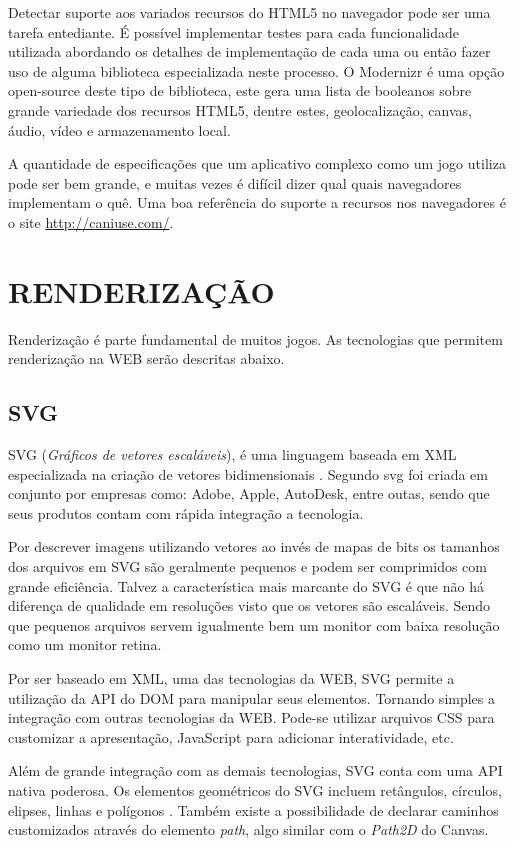 Detectar suporte aos variados recursos do HTML5 no navegador
pode ser uma tarefa entediante. É possível implementar testes para
cada funcionalidade utilizada abordando os detalhes de implementação
de cada uma ou então fazer uso de alguma biblioteca especializada
neste processo. O Modernizr é uma opção open-source deste tipo de
biblioteca, este gera uma lista de booleanos sobre grande variedade dos
recursos HTML5, dentre estes, geolocalização, canvas, áudio, vídeo e
armazenamento local.

A quantidade de especificações que um aplicativo complexo como um jogo
utiliza pode ser bem grande, e muitas vezes é difícil dizer qual quais
navegadores implementam o quê. Uma boa referência do suporte a recursos
nos navegadores é o site \url{http://caniuse.com/}.

\section{RENDERIZAÇÃO}
Renderização é parte fundamental de muitos jogos. As tecnologias que
permitem renderização na WEB serão descritas abaixo.
\subsection{SVG}
SVG (\textit{Gráficos de vetores escaláveis}), é uma linguagem
baseada em XML especializada na criação de vetores bidimensionais
\autocite{html5mostwanted}. Segundo \cite[pp. 4]{svgTime} svg foi criada
em conjunto por empresas como: Adobe, Apple, AutoDesk, entre outas,
sendo que seus produtos contam com rápida integração a tecnologia.

Por descrever imagens utilizando vetores ao invés de mapas de bits
os tamanhos dos arquivos em SVG são geralmente pequenos e podem
ser comprimidos com grande eficiência. Talvez a característica mais
marcante do SVG é que não há diferença de qualidade em resoluções
visto que os vetores são escaláveis. Sendo que pequenos arquivos
servem igualmente bem um monitor com baixa resolução como um monitor
retina.

Por ser baseado em XML, uma das tecnologias da WEB, SVG permite a
utilização da API do DOM para manipular seus elementos. Tornando
simples a integração com outras tecnologias da WEB. Pode-se utilizar
arquivos CSS para customizar a apresentação, JavaScript para adicionar
interatividade, etc.

Além de grande integração com as demais tecnologias, SVG conta com
uma API nativa poderosa. Os elementos geométricos do SVG incluem
retângulos, círculos, elipses, linhas e polígonos \autocite[pp.
5]{svgTime}. Também existe a possibilidade de declarar caminhos
customizados através do elemento \textit{path}, algo similar com o
\textit{Path2D} do Canvas.

